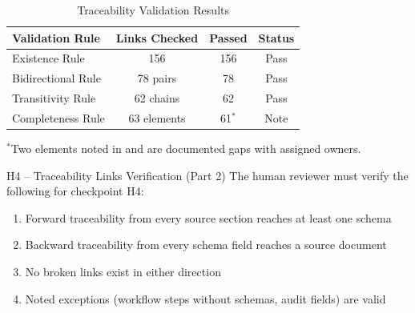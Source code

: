 \begin{table}[h]
\centering
\caption{Traceability Validation Results}
\label{tab:validation-results}
\begin{tabular}{@{}lccc@{}}
\toprule
\textbf{Validation Rule} & \textbf{Links Checked} & \textbf{Passed} & \textbf{Status} \\
\midrule
Existence Rule & 156 & 156 & \textcolor{sourcegreen}{Pass} \\
Bidirectional Rule & 78 pairs & 78 & \textcolor{sourcegreen}{Pass} \\
Transitivity Rule & 62 chains & 62 & \textcolor{sourcegreen}{Pass} \\
Completeness Rule & 63 elements & 61$^*$ & \textcolor{sapamber}{Note} \\
\bottomrule
\end{tabular}
\end{table}

$^*$Two elements noted in  and  are documented
gaps with assigned owners.

\begin{hitlbox}{H4 -- Traceability Links Verification (Part 2)}
The human reviewer must verify the following for checkpoint H4:
\begin{enumerate}[noitemsep]
  \item Forward traceability from every source section reaches at least one schema
  \item Backward traceability from every schema field reaches a source document
  \item No broken links exist in either direction
  \item Noted exceptions (workflow steps without schemas, audit fields) are valid
\end{enumerate}
\end{hitlbox}